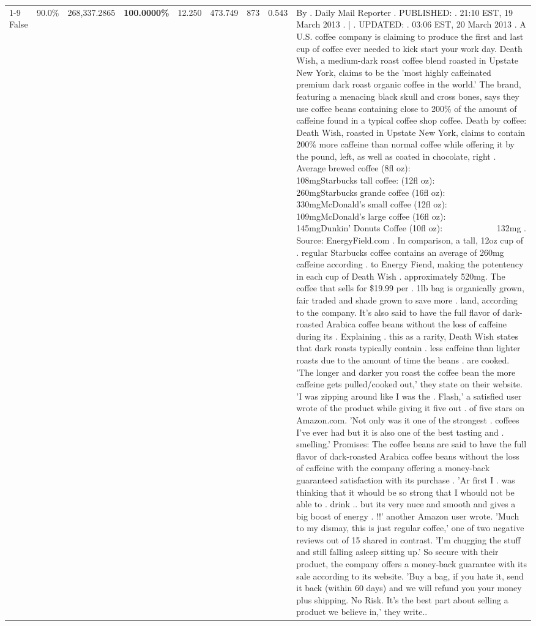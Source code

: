 \begin{table}[H]
{\begin{tabular}{lllrlllll}
\cline{1-9}
False & 90.0\% & \color{red} 268,337.2865 & \bfseries \color{red} 100.0000\% & 12.250 & 473.749 & 873 & 0.543 & By . Daily Mail Reporter . PUBLISHED: . 21:10 EST, 19 March 2013 . | . UPDATED: . 03:06 EST, 20 March 2013 . A U.S. coffee company is claiming to produce the first and last cup of coffee ever needed to kick start your work day. Death Wish, a medium-dark roast coffee blend roasted in Upstate New York, claims to be the 'most highly caffeinated premium dark roast organic coffee in the world.' The brand, featuring a menacing black skull and cross bones, says they use coffee beans containing close to 200\% of the amount of caffeine found in a typical coffee shop coffee. Death by coffee: Death Wish, roasted in Upstate New York, claims to contain 200\% more caffeine than normal coffee while offering it by the pound, left, as well as coated in chocolate, right . Average brewed coffee (8fl oz):              108mgStarbucks tall coffee: (12fl oz):                260mgStarbucks grande coffee (16fl oz):         330mgMcDonald's small coffee (12fl oz):           109mgMcDonald's large coffee (16fl oz):           145mgDunkin' Donuts Coffee (10fl oz):             132mg . Source: EnergyField.com . In comparison, a tall, 12oz cup of . regular Starbucks coffee contains an average of 260mg caffeine according . to Energy Fiend, making the potentency in each cup of Death Wish . approximately 520mg. The coffee that sells for \$19.99 per . 1lb bag is organically grown, fair traded and shade grown to save more . land, according to the company. It's also said to have the full flavor of dark-roasted Arabica coffee beans without the loss of caffeine during its . Explaining . this as a rarity, Death Wish states that dark roasts typically contain . less caffeine than lighter roasts due to the amount of time the beans . are cooked. 'The longer and darker you roast the coffee bean the more caffeine gets pulled/cooked out,' they state on their website. 'I was zipping around like I was the . Flash,' a satisfied user wrote of the product while giving it five out . of five stars on Amazon.com. 'Not only was it one of the strongest . coffees I've ever had but it is also one of the best tasting and . smelling.’ Promises: The coffee beans are said to have the full flavor of dark-roasted Arabica coffee beans without the loss of caffeine with the company offering a money-back guaranteed satisfaction with its purchase . 'Ar first I . was thinking that it whould be so strong that I whould not be able to . drink .. but its very nuce and smooth and gives a big boost of energy . !!' another Amazon user wrote. 'Much to my dismay, this is just regular coffee,' one of two negative reviews out of 15 shared in contrast. 'I'm chugging the stuff and still falling asleep sitting up.' So secure with their product, the company offers a money-back guarantee with its sale according to its website. 'Buy a bag, if you hate it, send it back (within 60 days) and we will refund you your money plus shipping. No Risk. It’s the best part about selling a product we believe in,' they write.. \\

\end{tabular}}
\end{table}
